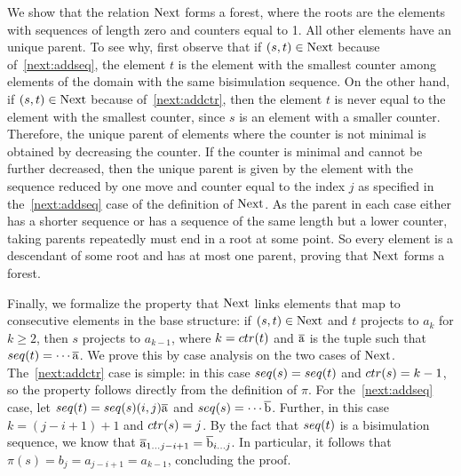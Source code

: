 We show that the relation $\mathrm{Next}$ forms a forest, where the roots are the elements with sequences of length zero and counters equal to 1.
All other elements have an unique parent.
To see why, first observe that if $(s, t) \in \mathrm{Next}$ because of~\ref{next:addseq}, the element $t$ is the element with the smallest counter among elements of the domain with the same bisimulation sequence.
On the other hand, if $(s, t) \in \mathrm{Next}$ because of~\ref{next:addctr}, then the element $t$ is never equal to the element with the smallest counter, since $s$ is an element with a smaller counter.
Therefore, the unique parent of elements where the counter is not minimal is obtained by decreasing the counter.
If the counter is minimal and cannot be further decreased, then the unique parent is given by the element with the sequence reduced by one move and counter equal to the index $j$ as specified in the~\ref{next:addseq} case of the definition of $\mathrm{Next}$.
As the parent in each case either has a shorter sequence or has a sequence of the same length but a lower counter, taking parents repeatedly must end in a root at some point.
So every element is a descendant of some root and has at most one parent, proving that $\mathrm{Next}$ forms a forest.

Finally, we formalize the property that $\mathrm{Next}$ links elements that map to consecutive elements in the base structure: if $(s,t) \in \mathrm{Next}$ and $t$ projects to $a_{k}$ for $k \ge 2$, then $s$ projects to $a_{k-1}$, where $k = \ctr{t}$ and $\overline{\mathrm{a}}$ is the tuple such that $\seq{t} = \cdots \elemtuplea$.
We prove this by case analysis on the two cases of $\mathrm{Next}$.
The~\ref{next:addctr} case is simple: in this case $\seq{s} = \seq{t}$ and $\ctr{s} = k - 1$, so the property follows directly from the definition of $\pi$.
For the~\ref{next:addseq} case, let $\seq{t} = \seq{s} (i,j) \elemtuplea$ and $\seq{s} = \cdots \elemtupleb$.
Further, in this case $k = (j - i + 1) + 1$ and $\ctr{s} = j$.
By the fact that $\seq{t}$ is a bisimulation sequence, we know that $\overline{\mathrm{a}}_{1\ldots j-i+1} = \overline{\mathrm{b}}_{i\ldots j}$.
In particular, it follows that $\pi(s) = b_{j} = a_{j-i+1} = a_{k-1}$, concluding the proof.

